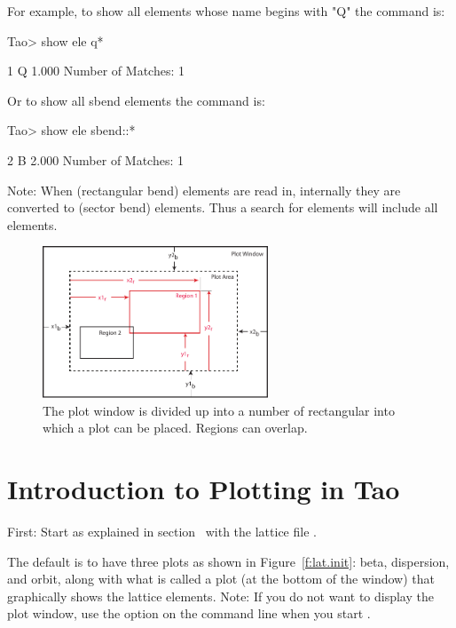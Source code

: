 \documentclass{hitec}
\newcommand{\Section}[1]{\section{#1}\vspace*{-1ex}}
\begin{document}
For example, to show all elements whose name begins with "Q" the command is:
\begin{code}
Tao> show ele q*

         1  Q                                                1.000
Number of Matches: 1
\end{code}

Or to show all sbend elements the command is:
\begin{code}  
Tao> show ele sbend::*

         2  B                                                2.000
Number of Matches: 1
\end{code}

Note: When  (rectangular bend) elements are read in, internally they are converted to
 (sector bend) elements. Thus a search for  elements will include all  elements.

\begin{figure}[b]
  \centering
  \includegraphics[width=0.6\textwidth]{plot-page.pdf}
  \caption{The plot window is divided up into a number of rectangular  into
which a plot  can be placed. Regions can overlap.}
  \label{f:plot.regions}
\end{figure}

\Section{Introduction to Plotting in Tao}

First: Start \tao as explained in section~ with the lattice file
.

The default is to have three plots as shown in Figure~\ref{f:lat.init}: beta, dispersion, and
orbit, along with what is called a  plot (at the bottom of the window) that
graphically shows the lattice elements. Note: If you do not want \tao to display the plot window,
use the  option on the command line when you start \tao.

\end{document}
